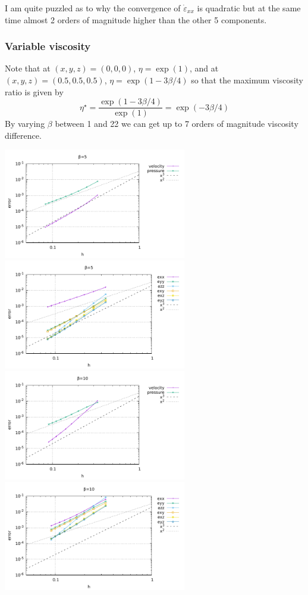 I am quite puzzled as to why the convergence 
of $\dot{\varepsilon}_{xx}$ is quadratic 
but at the same time almost 2 orders of magnitude higher than the other 5 components.



\subsubsection*{Variable viscosity}

Note that at $(x,y,z)=(0,0,0)$, $\eta=\exp(1)$, 
and at $(x,y,z)=(0.5,0.5,0.5)$, $\eta=\exp(1-3\beta/4)$
so that the maximum 
viscosity ratio is given by 
\[
\eta^\star = \frac{\exp(1-3\beta/4)}{\exp(1)} = \exp(-3\beta/4)
\]
By varying $\beta$ between 1 and 22 we can get up to 7 orders of magnitude viscosity difference.


\begin{center}
\includegraphics[width=8cm]{python_codes/fieldstone_17/results_beta5/errors.pdf}
\includegraphics[width=8cm]{python_codes/fieldstone_17/results_beta5/errors_sr.pdf}\\
\includegraphics[width=8cm]{python_codes/fieldstone_17/results_beta10/errors.pdf}
\includegraphics[width=8cm]{python_codes/fieldstone_17/results_beta10/errors_sr.pdf}
\end{center}

